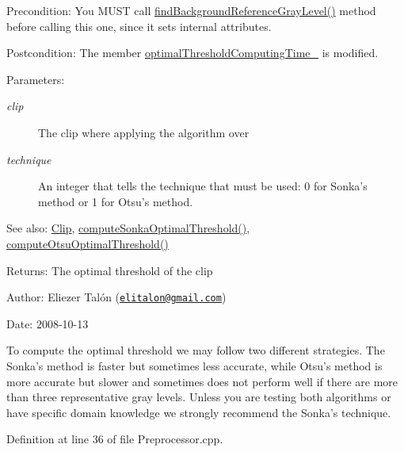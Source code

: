 \begin{Desc}
\item[Precondition:]You MUST call \hyperlink{class_preprocessor_a941f81382bd8e235e4dd12481342be4}{findBackgroundReferenceGrayLevel()} method before calling this one, since it sets internal attributes. \end{Desc}
\begin{Desc}
\item[Postcondition:]The member \hyperlink{class_preprocessor_d606fe1f0be7f7be60583f59278e2df6}{optimalThresholdComputingTime\_\-} is modified.\end{Desc}
\begin{Desc}
\item[Parameters:]
\begin{description}
\item[{\em clip}]The clip where applying the algorithm over \item[{\em technique}]An integer that tells the technique that must be used: 0 for Sonka's method or 1 for Otsu's method.\end{description}
\end{Desc}
\begin{Desc}
\item[See also:]\hyperlink{class_clip}{Clip}, \hyperlink{class_preprocessor_3d4fa7e4721c62997beb93a41d729c99}{computeSonkaOptimalThreshold()}, \hyperlink{class_preprocessor_faa4368f471a3e5d0cb46865a2a1ccb7}{computeOtsuOptimalThreshold()}\end{Desc}
\begin{Desc}
\item[Returns:]The optimal threshold of the clip\end{Desc}
\begin{Desc}
\item[Author:]Eliezer Talón (\href{mailto:elitalon@gmail.com}{\tt elitalon@gmail.com}) \end{Desc}
\begin{Desc}
\item[Date:]2008-10-13\end{Desc}
To compute the optimal threshold we may follow two different strategies. The Sonka's method is faster but sometimes less accurate, while Otsu's method is more accurate but slower and sometimes does not perform well if there are more than three representative gray levels. Unless you are testing both algorithms or have specific domain knowledge we strongly recommend the Sonka's technique. 

Definition at line 36 of file Preprocessor.cpp.

